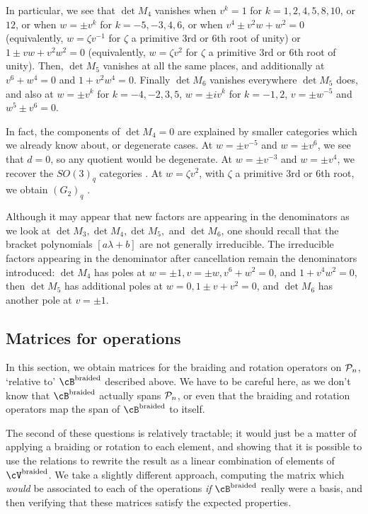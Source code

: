 \documentclass[12pt]{amsart}
\begin{document}
In particular, we see that $\det M_4$ vanishes when $v^k = 1$ for
$k=1,2,4,5,8,10$, or $12$, or when $w = \pm v^k$ for $k=-5,-3,4,6$, or when
$v^4 \pm v^2 w + w^2 = 0$ (equivalently, $w = \zeta v^{-1}$ for $\zeta$ a
primitive 3rd or 6th root of unity) or $1 \pm v w + v^2 w^2 = 0$
(equivalently, $w = \zeta v^2$ for $\zeta$ a primitive 3rd or 6th root of
unity). Then, $\det M_5$ vanishes at all the same places, and additionally at
$v^6 + w^4 = 0$ and $1 + v^2 w^4 = 0$.  Finally $\det M_6$ vanishes everywhere $\det
M_5$ does, and also at $w = \pm v^k$ for $k=-4,-2,3,5$, $w = \pm i v^k$ for
$k=-1,2$, $v = \pm w^{-5}$ and $w^5 \pm v^6 = 0$.

In fact, the components of $\det M_4 = 0$ are explained by smaller categories
which we already know about, or degenerate cases.  At $w = \pm v^{-5}$ and $w =
\pm v^6$, we see that $d=0$, so any quotient would be degenerate. At $w = \pm
v^{-3}$ and $w = \pm v^4$, we recover the $SO(3)_q$ categories .
At $w = \zeta v^2$, with $\zeta$ a primitive 3rd or 6th root, we obtain
$(G_2)_q$ . 

Although it may appear that new factors are appearing in the
denominators as we look at $\det M_3, \det M_4, \det M_5, $ and $\det
M_6$, one should recall that the bracket polynomials $[a \lambda + b]$
are not generally irreducible. The
irreducible factors appearing in the denominator after cancellation
remain the denominators  introduced: $\det M_4$ has poles
at $w=\pm1, v=\pm w, v^6+w^2 = 0$, and $1+v^4w^2 = 0$,
then $\det M_5$ has additional poles at $w=0, 1\pm v + v^2 = 0$, and $\det M_6$
has another pole at $v = \pm 1$.


\subsection{Matrices for operations}
In this section, we obtain matrices for the braiding and rotation operators on
 $\mathcal{P}_n$, `relative to' $\cB^{\text{braided}}$ described above.
We have to be careful here, as we don't know that $\cB^{\text{braided}}$
actually spans $\mathcal{P}_n$, or even that the braiding and rotation operators map
the span of $\cB^{\text{braided}}$ to itself.

The second of these questions is relatively tractable; it would just be a
matter of applying a braiding or rotation to each element, and showing that it
is possible to use the relations to rewrite the result as a linear combination
of elements of $\cV^{\text{braided}}$. We take a slightly different approach,
computing the matrix which \emph{would} be associated to each of the
operations \emph{if} $\cB^{\text{braided}}$ really were a basis, and then
verifying that these matrices satisfy the expected properties.
\end{document}
